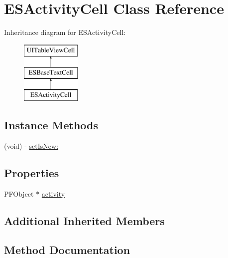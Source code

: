 \hypertarget{interface_e_s_activity_cell}{}\section{E\+S\+Activity\+Cell Class Reference}
\label{interface_e_s_activity_cell}
Inheritance diagram for E\+S\+Activity\+Cell\+:\begin{figure}[H]
\begin{center}
\leavevmode
\includegraphics[height=3.000000cm]{interface_e_s_activity_cell}
\end{center}
\end{figure}
\subsection*{Instance Methods}
\begin{DoxyCompactItemize}
\item 
(void) -\/ \hyperlink{interface_e_s_activity_cell_a3a8af1c87976402d5fd3dc6a9a477afb}{set\+Is\+New\+:}
\end{DoxyCompactItemize}
\subsection*{Properties}
\begin{DoxyCompactItemize}
\item 
P\+F\+Object $\ast$ \hyperlink{interface_e_s_activity_cell_a0f685740c7ed1d931892b5f03b95a7a7}{activity}
\end{DoxyCompactItemize}
\subsection*{Additional Inherited Members}


\subsection{Method Documentation}
\hypertarget{interface_e_s_activity_cell_a3a8af1c87976402d5fd3dc6a9a477afb}{}
